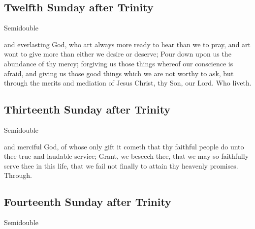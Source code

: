 \subsection{Twelfth Sunday after Trinity}
\begin{inhead}
{Semidouble}
\end{inhead}



\collect
{} and everlasting God, who art always more ready to hear than we to pray, and art wont to give more than either we desire or deserve; Pour down upon us the abundance of thy mercy; forgiving us those things whereof our conscience is afraid, and giving us those good things which we are not worthy to ask, but through the merits and mediation of Jesus Christ, thy Son, our Lord. Who liveth.


\subsection{Thirteenth Sunday after Trinity}
\begin{inhead}
{Semidouble}
\end{inhead}



\collect
{} and merciful God, of whose only gift it cometh that thy faithful people do unto thee true and laudable service; Grant, we beseech thee, that we may so faithfully serve thee in this life, that we fail not finally to attain thy heavenly promises. Through.


\subsection{Fourteenth Sunday after Trinity}
\begin{inhead}
{Semidouble}
\end{inhead}

